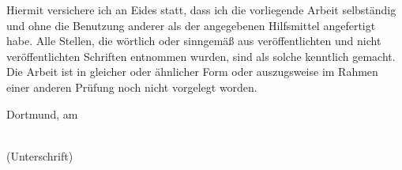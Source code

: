 Hiermit versichere ich an Eides statt, dass ich die vorliegende Arbeit selbständig und ohne die Benutzung anderer als der angegebenen Hilfsmittel angefertigt habe. Alle Stellen, die wörtlich oder sinngemäß aus veröffentlichten und nicht veröffentlichten Schriften entnommen wurden, sind als solche kenntlich gemacht. Die Arbeit ist in gleicher oder ähnlicher Form oder auszugsweise im Rahmen einer anderen Prüfung noch nicht vorgelegt worden.
		
\vspace{4cm}
		
\noindent
\begin{minipage}[h]{0.4\linewidth}
	Dortmund, am \dotfill\\
	\vspace*{2.5mm}
\end{minipage}
	\hspace*{0.1\linewidth}
	\begin{minipage}[h]{0.5\linewidth}
	\begin{center}
		\dotfill\\
		(Unterschrift)
	\end{center}
\end{minipage}
